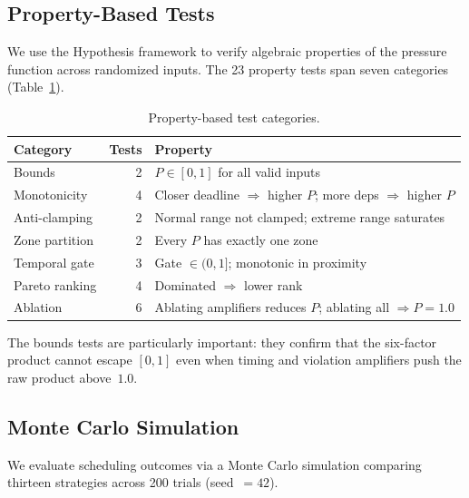 \documentclass[11pt]{article}
\begin{document}
\subsection{Property-Based Tests}
\label{sec:property}

We use the Hypothesis framework to verify algebraic properties
of the pressure function across randomized inputs.
The 23 property tests span seven categories
(Table~\ref{tab:properties}).

\begin{table}[h!]
\centering
\caption{Property-based test categories.}
\label{tab:properties}
\begin{tabular}{@{}lrl@{}}
\toprule
\textbf{Category} & \textbf{Tests} & \textbf{Property} \\
\midrule
Bounds          & 2 & $P \in [0, 1]$ for all valid inputs \\
Monotonicity    & 4 & Closer deadline $\Rightarrow$ higher $P$;
                        more deps $\Rightarrow$ higher $P$ \\
Anti-clamping   & 2 & Normal range not clamped; extreme range
                        saturates \\
Zone partition  & 2 & Every $P$ has exactly one zone \\
Temporal gate   & 3 & Gate $\in (0, 1]$; monotonic in proximity \\
Pareto ranking  & 4 & Dominated $\Rightarrow$ lower rank \\
Ablation        & 6 & Ablating amplifiers reduces $P$;
                        ablating all $\Rightarrow P = 1.0$ \\
\bottomrule
\end{tabular}
\end{table}

The bounds tests are particularly important: they confirm that
the six-factor product cannot escape $[0, 1]$ even when timing
and violation amplifiers push the raw product above~$1.0$.

\subsection{Monte Carlo Simulation}
\label{sec:monte_carlo}

We evaluate scheduling outcomes via a Monte Carlo simulation
comparing thirteen strategies across 200 trials (seed~$= 42$).
\end{document}
